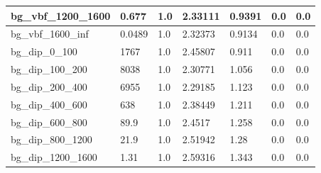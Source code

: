 \documentclass[a4paper, 10pt]{article}
\begin{document}
\begin{table}[H]
\begin{center}
\begin{tabular}{|m{23.0mm}|m{23.0mm}|m{18.0mm}|m{19.0mm}|m{19.0mm}|m{19.0mm}|m{19.0mm}|}
      \hline
      {\cellcolor{white}         bg\_vbf\_1200\_1600}& {\cellcolor{white}         0.677}& {\cellcolor{white}         1.0}& {\cellcolor{white}         2.33111}& {\cellcolor{white}         0.9391}& {\cellcolor{green}         0.0}& {\cellcolor{green}         0.0}\\
      \hline
      {\cellcolor{white}         bg\_vbf\_1600\_inf}& {\cellcolor{white}         0.0489}& {\cellcolor{white}         1.0}& {\cellcolor{white}         2.32373}& {\cellcolor{white}         0.9134}& {\cellcolor{green}         0.0}& {\cellcolor{green}         0.0}\\
      \hline
      {\cellcolor{white}         bg\_dip\_0\_100}& {\cellcolor{white}         1767}& {\cellcolor{white}         1.0}& {\cellcolor{white}         2.45807}& {\cellcolor{white}         0.911}& {\cellcolor{green}         0.0}& {\cellcolor{green}         0.0}\\
      \hline
      {\cellcolor{white}         bg\_dip\_100\_200}& {\cellcolor{white}         8038}& {\cellcolor{white}         1.0}& {\cellcolor{white}         2.30771}& {\cellcolor{white}         1.056}& {\cellcolor{green}         0.0}& {\cellcolor{green}         0.0}\\
      \hline
      {\cellcolor{white}         bg\_dip\_200\_400}& {\cellcolor{white}         6955}& {\cellcolor{white}         1.0}& {\cellcolor{white}         2.29185}& {\cellcolor{white}         1.123}& {\cellcolor{green}         0.0}& {\cellcolor{green}         0.0}\\
      \hline
      {\cellcolor{white}         bg\_dip\_400\_600}& {\cellcolor{white}         638}& {\cellcolor{white}         1.0}& {\cellcolor{white}         2.38449}& {\cellcolor{white}         1.211}& {\cellcolor{green}         0.0}& {\cellcolor{green}         0.0}\\
      \hline
      {\cellcolor{white}         bg\_dip\_600\_800}& {\cellcolor{white}         89.9}& {\cellcolor{white}         1.0}& {\cellcolor{white}         2.4517}& {\cellcolor{white}         1.258}& {\cellcolor{green}         0.0}& {\cellcolor{green}         0.0}\\
      \hline
      {\cellcolor{white}         bg\_dip\_800\_1200}& {\cellcolor{white}         21.9}& {\cellcolor{white}         1.0}& {\cellcolor{white}         2.51942}& {\cellcolor{white}         1.28}& {\cellcolor{green}         0.0}& {\cellcolor{green}         0.0}\\
      \hline
      {\cellcolor{white}         bg\_dip\_1200\_1600}& {\cellcolor{white}         1.31}& {\cellcolor{white}         1.0}& {\cellcolor{white}         2.59316}& {\cellcolor{white}         1.343}& {\cellcolor{green}         0.0}& {\cellcolor{green}         0.0}\\

\end{tabular}
\end{center}
\end{table}
\end{document}
